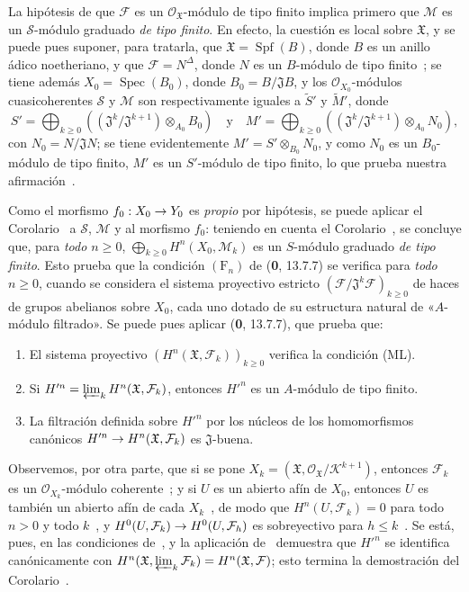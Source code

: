 \documentclass[10pt,oneside,openany]{book}
\theoremstyle{egaenv}\newtheorem*{env}{---}
\theoremstyle{egastatement}
\theoremstyle{egadescription}
\newcommand{\oldpage}[2][]{\marginnote{\normalfont\scriptsize\textbf{#1}\,|\,#2}\ignorespaces}
\renewcommand{\leq}{\leqslant}
\renewcommand{\geq}{\geqslant}
\renewcommand{\to}{\mathchoice{\longrightarrow}{\rightarrow}{\rightarrow}{\rightarrow}}
\begin{document}
La hipótesis de que $\mathcal F$ es un $\mathcal O_{\mathfrak X}$-módulo de tipo finito implica primero que $\mathcal M$ es
\oldpage[III]{121}
un $\mathcal S$-módulo graduado \emph{de tipo finito}.
En efecto, la cuestión es local sobre $\mathfrak X$, y se puede pues suponer, para tratarla, que $\mathfrak X=\operatorname{Spf}(B)$, donde $B$ es un anillo ádico noetheriano, y que $\mathcal F=N^\Delta$, donde $N$ es un $B$-módulo de tipo finito~; se tiene además $X_0=\operatorname{Spec}(B_0)$, donde $B_0=B/\mathfrak J B$, y los $\mathcal O_{X_0}$-módulos cuasicoherentes $\mathcal S$ y $\mathcal M$ son respectivamente iguales a $\widetilde{S}'$ y $\widetilde{M}'$, donde
\[
S'=\bigoplus_{k\geq0}
((\mathfrak J^k/\mathfrak J^{k+1})\otimes_{A_0}B_0)\quad\text{y}\quad
M'=\bigoplus_{k\geq0}
((\mathfrak J^k/\mathfrak J^{k+1})\otimes_{A_0}N_0),
\]
con $N_0=N/\mathfrak JN$; se tiene evidentemente $M'=S'\otimes_{B_0}N_0$, y como $N_0$ es un $B_0$-módulo de tipo finito, $M'$ es un $S'$-módulo de tipo finito, lo que prueba nuestra afirmación~.

Como el morfismo $f_0:X_0\to Y_0$ es \emph{propio} por hipótesis, se puede aplicar el Corolario~ a $\mathcal S$, $\mathcal M$ y al morfismo $f_0$: teniendo en cuenta el Corolario~, se concluye que, para \emph{todo $n\geq0$}, $\bigoplus_{k\geq0}H^n(X_0,\mathcal M_k)$ es un $S$-módulo graduado \emph{de
tipo finito}. Esto prueba que la condición $(\mathrm F_n)$ de (\textbf{0}, 13.7.7) se
verifica para \emph{todo $n\geq0$}, cuando se considera el sistema proyectivo estricto $(\mathcal F/\mathfrak J^k\mathcal F)_{k\geq0}$ de haces de grupos abelianos sobre $X_0$, cada uno dotado de su estructura natural de «$A$-módulo filtrado». Se puede pues aplicar (\textbf{0}, 13.7.7), que prueba que:
\begin{enumerate}
\item[$1^\circ$] El sistema proyectivo
$(H^n(\mathfrak X,\mathcal F_k))_{k\geq0}$ verifica la condición (ML).
\item[$2^\circ$] Si
$H'^{n}=\varprojlim_kH^n(\mathfrak X,\mathcal F_k)$, entonces $H'^{n}$ es un $A$-módulo de tipo finito.
\item[$3^\circ$] La filtración definida sobre $H'^{n}$ por los núcleos de los homomorfismos canónicos $H'^{n}\to H^n(\mathfrak X,\mathcal F_k)$ es $\mathfrak J$-buena.
\end{enumerate}

Observemos, por otra parte, que si se pone $X_k=(\mathfrak X,\mathcal O_{\mathfrak X}/\mathcal K^{k+1})$, entonces $\mathcal F_k$ es un $\mathcal O_{X_k}$-módulo coherente~; y si $U$ es un abierto afín de $X_0$, entonces $U$ es también un abierto afín de cada $X_k$~, de modo que $H^n(U,\mathcal F_k)=0$ para todo $n>0$ y todo $k$~, y $H^0(U,\mathcal F_k)\to H^0(U,\mathcal F_h)$ es sobreyectivo para $h\leq k$~.
Se está, pues, en las condiciones de~, y la aplicación de~ demuestra que $H'^{n}$ se identifica canónicamente con $H^n(\mathfrak X,\varprojlim_k\mathcal F_k)=H^n(\mathfrak X,\mathcal F)$; esto termina la demostración del Corolario~.
\end{document}
